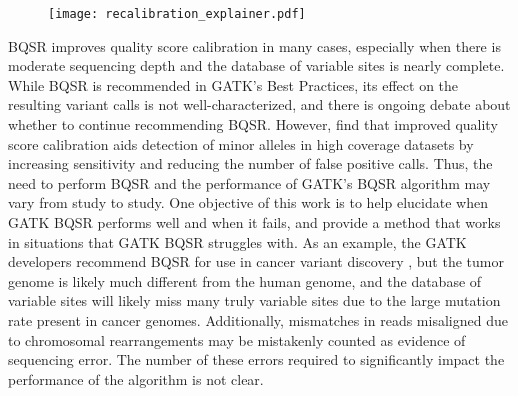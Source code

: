 \begin{figure}
\centering
	\texttt{[image: recalibration\_explainer.pdf]}
	\label{fig:recal_explain}
\end{figure}


BQSR improves quality score calibration in many cases, especially when there is moderate sequencing depth and the database of variable sites is nearly complete. %
While BQSR is recommended in GATK's Best Practices, its effect on the resulting variant calls is not well-characterized, and there is ongoing debate about whether to continue recommending BQSR. \parencite{van_der_auwera_geraldine_2020, van_der_auwera_geraldine_2020_b}
However, \cite{ni_improvement_2016} find that improved quality score calibration aids detection of minor alleles in high coverage datasets by increasing sensitivity and reducing the number of false positive calls.
Thus, the need to perform BQSR and the performance of GATK's BQSR algorithm may vary from study to study.
One objective of this work is to help elucidate when GATK BQSR performs well and when it fails, and provide a method that works in situations that GATK BQSR struggles with.
As an example, the GATK developers recommend BQSR for use in cancer variant discovery \parencite{cibulskis_sensitive_2013}, but the tumor genome is likely much different from the human genome, and the database of variable sites will likely miss many truly variable sites due to the large mutation rate present in cancer genomes. Additionally, mismatches in reads misaligned due to chromosomal rearrangements may be mistakenly counted as evidence of sequencing error. The number of these errors required to significantly impact the performance of the algorithm is not clear.

